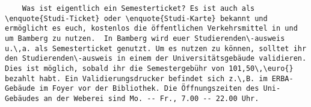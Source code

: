 \begin{verbatim}
	Was ist eigentlich ein Semesterticket? Es ist auch als \enquote{Studi-Ticket} oder \enquote{Studi-Karte} bekannt und ermöglicht es euch, kostenlos die öffentlichen Verkehrsmittel in und um Bamberg zu nutzen.  In Bamberg wird euer Studierenden\-ausweis u.\,a. als Semesterticket genutzt. Um es nutzen zu können, solltet ihr den Studierenden\-ausweis in einem der Universitätsgebäude validieren. Dies ist möglich, sobald ihr die Semestergebühr von 101,50\,\euro{} bezahlt habt. Ein Validierungsdrucker befindet sich z.\,B. im ERBA-Gebäude im Foyer vor der Bibliothek. Die Öffnungszeiten des Uni-Gebäudes an der Weberei sind Mo. -- Fr., 7.00 -- 22.00 Uhr. 
\end{verbatim}

